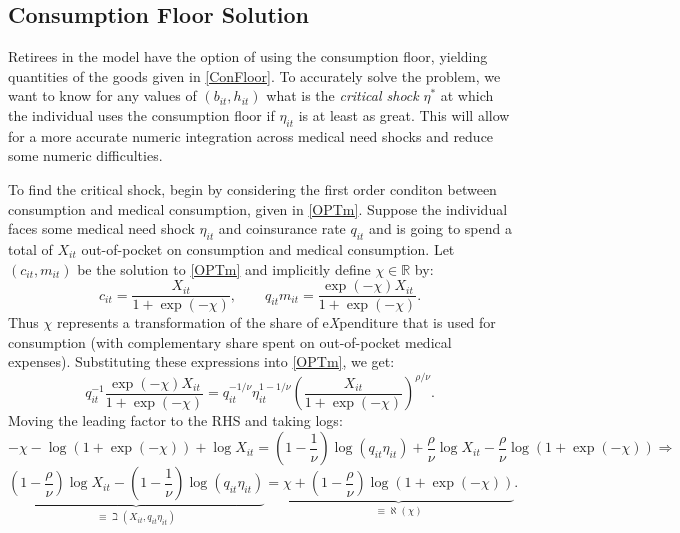 \documentclass[12pt,pdftex,letterpaper]{article}
\newcommand{\R}{\mathbb{R}}
\newcommand{\Health}{h}
\newcommand{\Con}{c}
\newcommand{\Care}{m}
\newcommand{\Xpend}{X}
\newcommand{\Bank}{b}
\newcommand{\Copay}{q}
\newcommand{\CRRAcon}{\rho}
\newcommand{\CRRAcare}{\nu}
\newcommand{\MedShk}{\eta}
\begin{document}
\subsection{Consumption Floor Solution}
\label{app:ConFloorSolution}

Retirees in the model have the option of using the consumption floor, yielding quantities of the goods given in \eqref{ConFloor}.  To accurately solve the problem, we want to know for any values of $(\Bank_{it},\Health_{it})$ what is the \textit{critical shock} $\MedShk^*$ at which the individual uses the consumption floor if $\MedShk_{it}$ is at least as great.  This will allow for a more accurate numeric integration across medical need shocks and reduce some numeric difficulties.

To find the critical shock, begin by considering the first order conditon between consumption and medical consumption, given in \eqref{OPTm}.  Suppose the individual faces some medical need shock $\MedShk_{it}$ and coinsurance rate $\Copay_{it}$ and is going to spend a total of $\Xpend_{it}$ out-of-pocket on consumption and medical consumption.  Let $(\Con_{it},\Care_{it})$ be the solution to \eqref{OPTm} and implicitly define $\chi \in \R$ by:
\begin{equation}\label{Xpend}
\Con_{it} = \frac{\Xpend_{it}}{1 + \exp(-\chi)}, \qquad \Copay_{it} \Care_{it} = \frac{\exp(-\chi)\Xpend_{it}}{1 + \exp(-\chi)}.
\end{equation}
Thus $\chi$ represents a transformation of the share of e\textit{X}penditure that is used for consumption (with complementary share spent on out-of-pocket medical expenses).  Substituting these expressions into \eqref{OPTm}, we get:
\begin{equation}
\Copay_{it}^{-1} \frac{\exp(-\chi)\Xpend_{it}}{1 + \exp(-\chi)} = \Copay_{it}^{-1/\CRRAcare} \MedShk_{it}^{1-1/\CRRAcare} \left(\frac{\Xpend_{it}}{1 + \exp(-\chi)} \right)^{\CRRAcon/\CRRAcare}.
\end{equation}
Moving the leading factor to the RHS and taking logs:
\begin{equation*}
-\chi - \log(1 + \exp(-\chi)) + \log \Xpend_{it} = \left(1-\frac{1}{\CRRAcare}\right) \log(\Copay_{it} \MedShk_{it}) + \frac{\CRRAcon}{\CRRAcare} \log \Xpend_{it} - \frac{\CRRAcon}{\CRRAcare} \log(1 + \exp(-\chi)) \Longrightarrow
\end{equation*}
\begin{equation}\label{AlephBeth}
\underbrace{\left(1-\frac{\CRRAcon}{\CRRAcare}\right) \log \Xpend_{it} - \left(1-\frac{1}{\CRRAcare}\right) \log(\Copay_{it} \MedShk_{it})}_{\equiv \beth(\Xpend_{it}, \Copay_{it} \MedShk_{it})} = 
\underbrace{\chi + \left(1-\frac{\CRRAcon}{\CRRAcare}\right) \log(1 + \exp(-\chi))}_{\equiv \aleph(\chi)}.
\end{equation}
\end{document}
